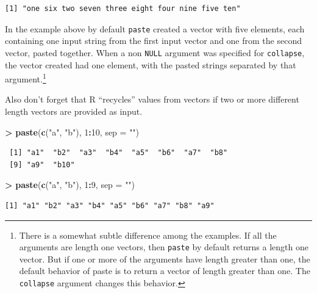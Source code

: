 \documentclass[]{krantz}
\makeatletter
\newenvironment{Shaded}{\begin{snugshade}}{\end{snugshade}}
\newcommand{\KeywordTok}[1]{\textcolor[rgb]{0.27,0.27,0.27}{\textbf{#1}}}
\newcommand{\DataTypeTok}[1]{\textcolor[rgb]{0.27,0.27,0.27}{#1}}
\newcommand{\DecValTok}[1]{\textcolor[rgb]{0.06,0.06,0.06}{#1}}
\newcommand{\StringTok}[1]{\textcolor[rgb]{0.5,0.5,0.5}{#1}}
\newcommand{\OperatorTok}[1]{\textcolor[rgb]{0.43,0.43,0.43}{\textbf{#1}}}
\newcommand{\NormalTok}[1]{#1}
\newenvironment{kframe}{%
\medskip{}
\setlength{\fboxsep}{.8em}
 \def\at@end@of@kframe{}%
 \ifinner\ifhmode%
  \def\at@end@of@kframe{\end{minipage}}%
  \begin{minipage}{\columnwidth}%
 \fi\fi%
 \def\FrameCommand##1{\hskip\@totalleftmargin \hskip-\fboxsep
 \colorbox{shadecolor}{##1}\hskip-\fboxsep
     \hskip-\linewidth \hskip-\@totalleftmargin \hskip\columnwidth}%
 \MakeFramed {\advance\hsize-\width
   \@totalleftmargin\z@ \linewidth\hsize
   \@setminipage}}%
 {\par\unskip\endMakeFramed%
 \at@end@of@kframe}
\renewenvironment{Shaded}{\begin{kframe}}{\end{kframe}}
\makeatother
\begin{document}
\begin{verbatim}
[1] "one six two seven three eight four nine five ten"
\end{verbatim}

In the example above by default \texttt{paste} created a vector with
five elements, each containing one input string from the first input
vector and one from the second vector, pasted together. When a non
\texttt{NULL} argument was specified for \texttt{collapse}, the vector
created had one element, with the pasted strings separated by that
argument.\footnote{There is a somewhat subtle difference among the
  examples. If all the arguments are length one vectors, then
  \texttt{paste} by default returns a length one vector. But if one or
  more of the arguments have length greater than one, the default
  behavior of paste is to return a vector of length greater than one.
  The \texttt{collapse} argument changes this behavior.}

Also don't forget that R ``recycles'' values from vectors if two or more
different length vectors are provided as input.

\begin{Shaded}
\begin{Highlighting}[]
\OperatorTok{>}\StringTok{ }\KeywordTok{paste}\NormalTok{(}\KeywordTok{c}\NormalTok{(}\StringTok{"a"}\NormalTok{, }\StringTok{"b"}\NormalTok{), }\DecValTok{1}\OperatorTok{:}\DecValTok{10}\NormalTok{, }\DataTypeTok{sep =} \StringTok{""}\NormalTok{)}
\end{Highlighting}
\end{Shaded}

\begin{verbatim}
 [1] "a1"  "b2"  "a3"  "b4"  "a5"  "b6"  "a7"  "b8" 
 [9] "a9"  "b10"
\end{verbatim}

\begin{Shaded}
\begin{Highlighting}[]
\OperatorTok{>}\StringTok{ }\KeywordTok{paste}\NormalTok{(}\KeywordTok{c}\NormalTok{(}\StringTok{"a"}\NormalTok{, }\StringTok{"b"}\NormalTok{), }\DecValTok{1}\OperatorTok{:}\DecValTok{9}\NormalTok{, }\DataTypeTok{sep =} \StringTok{""}\NormalTok{)}
\end{Highlighting}
\end{Shaded}

\begin{verbatim}
[1] "a1" "b2" "a3" "b4" "a5" "b6" "a7" "b8" "a9"
\end{verbatim}
\end{document}
